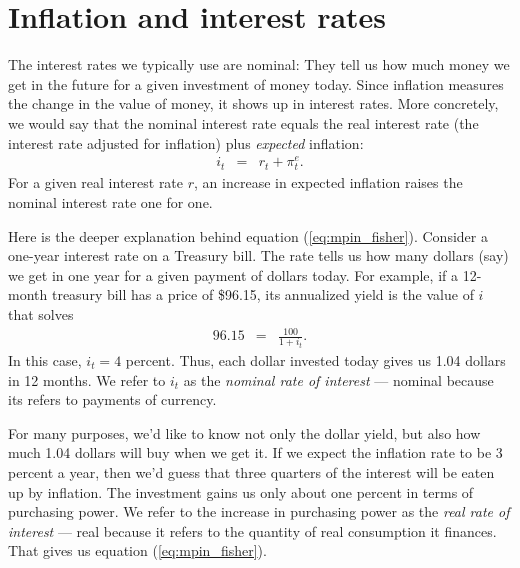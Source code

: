 \section{Inflation and interest rates}

The interest rates we typically use are nominal: They tell us how much money we get in the future
for a given investment of money today.
Since inflation measures the change in the value
of money, it shows up in interest rates.
More concretely, we would say that the nominal interest
rate equals the real interest rate (the interest rate
adjusted for inflation) plus \textit{expected} 
inflation:
\begin{eqnarray}
    i_t &=& r_t + \pi_t^e .
    \label{eq:mpin_fisher}
\end{eqnarray}
For a given real interest rate $r$,
an increase in expected inflation raises the nominal interest rate
one for one.


Here is the deeper explanation behind equation (\ref{eq:mpin_fisher}).
Consider a one-year interest rate on a Treasury bill. 
The rate tells us how many dollars (say)
we get in one year for a given payment of dollars today.
For example, if a 12-month treasury bill has a price
of \$96.15, its annualized yield 
 is the value of $i$ that solves
%
\begin{eqnarray}
    96.15 &=& \frac{100}{1+i_t}.
    \label{eq:nominal_yield}
\end{eqnarray}
%
In this case, $i_t = 4$ percent.  Thus, each dollar invested today gives us
1.04 dollars in 12 months.
We refer to $i_t$ as the  {\it nominal rate of interest\/} --- nominal because its refers to payments of currency.

For many purposes, we'd like to know not only the dollar yield, but
also how much 1.04 dollars will buy when we get it.  If we expect
the inflation rate to be 3 percent a year, then we'd guess that three quarters of the
interest will be eaten up by inflation.  The investment gains
us only about one percent in terms of purchasing power.
We refer to the increase in purchasing power as the
{\it real rate of interest\/} --- real because it refers to the
quantity of real consumption it finances.
That gives us equation (\ref{eq:mpin_fisher}).


